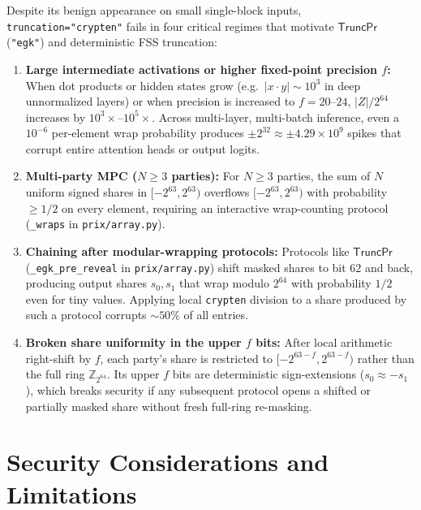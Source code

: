 \documentclass[11pt]{article}
\newcommand{\Zring}{\mathbb{Z}_{2^{64}}}
\begin{document}
Despite its benign appearance on small single-block inputs, \texttt{truncation="crypten"} fails in four critical regimes that motivate $\mathsf{TruncPr}$ (\texttt{"egk"}) and deterministic FSS truncation:
\begin{enumerate}
    \item \textbf{Large intermediate activations or higher fixed-point precision $f$:} When dot products or hidden states grow (e.g.\ $|x \cdot y| \sim 10^3$ in deep unnormalized layers) or when precision is increased to $f = 20$--$24$, $|Z|/2^{64}$ increases by $10^3\times$--$10^5\times$. Across multi-layer, multi-batch inference, even a $10^{-6}$ per-element wrap probability produces $\pm 2^{32} \approx \pm 4.29\times 10^9$ spikes that corrupt entire attention heads or output logits.
    \item \textbf{Multi-party MPC ($N \ge 3$ parties):} For $N \ge 3$ parties, the sum of $N$ uniform signed shares in $[-2^{63}, 2^{63})$ overflows $[-2^{63}, 2^{63})$ with probability $\ge 1/2$ on every element, requiring an interactive wrap-counting protocol (\texttt{\_wraps} in \texttt{prix/array.py}).
    \item \textbf{Chaining after modular-wrapping protocols:} Protocols like $\mathsf{TruncPr}$ (\texttt{\_egk\_pre\_reveal} in \texttt{prix/array.py}) shift masked shares to bit $62$ and back, producing output shares $s_0, s_1$ that wrap modulo $2^{64}$ with probability $1/2$ even for tiny values. Applying local \texttt{crypten} division to a share produced by such a protocol corrupts $\sim 50\%$ of all entries.
    \item \textbf{Broken share uniformity in the upper $f$ bits:} After local arithmetic right-shift by $f$, each party's share is restricted to $[-2^{63-f}, 2^{63-f})$ rather than the full ring $\Zring$. Its upper $f$ bits are deterministic sign-extensions ($s_0 \approx -s_1$), which breaks security if any subsequent protocol opens a shifted or partially masked share without fresh full-ring re-masking.
\end{enumerate}

\section{Security Considerations and Limitations}
\label{sec:security}
\end{document}
